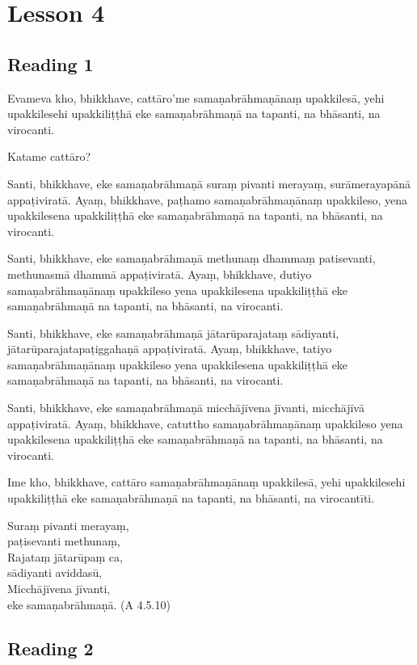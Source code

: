 \chapter{Lesson 4}

\section*{Reading 1}

Evameva kho, bhikkhave, cattāro’me samaṇabrāhmaṇānaṃ upakkilesā, yehi upakkilesehi upakkiliṭṭhā eke samaṇabrāhmaṇā na tapanti, na bhāsanti, na virocanti.

Katame cattāro?

Santi, bhikkhave, eke samaṇabrāhmaṇā suraṃ pivanti merayaṃ, surāmerayapānā appaṭiviratā. Ayaṃ, bhikkhave, paṭhamo samaṇabrāhmaṇānaṃ upakkileso, yena upakkilesena upakkiliṭṭhā eke samaṇabrāhmaṇā na tapanti, na bhāsanti, na virocanti.

Santi, bhikkhave, eke samaṇabrāhmaṇā methunaṃ dhammaṃ patisevanti, methunasmā dhammā appaṭiviratā. Ayaṃ, bhikkhave, dutiyo samaṇabrāhmaṇānaṃ upakkileso yena upakkilesena upakkiliṭṭhā eke samaṇabrāhmaṇā na tapanti, na bhāsanti, na virocanti.

Santi, bhikkhave, eke samaṇabrāhmaṇā jātarūparajataṃ sādiyanti, jātarūparajatapaṭiggahaṇā appaṭiviratā. Ayaṃ, bhikkhave, tatiyo samaṇabrāhmaṇānaṃ upakkileso yena upakkilesena upakkiliṭṭhā eke samaṇabrāhmaṇā na tapanti, na bhāsanti, na virocanti.

Santi, bhikkhave, eke samaṇabrāhmaṇā micchājīvena jīvanti, micchājīvā appaṭiviratā. Ayaṃ, bhikkhave, catuttho samaṇabrāhmaṇānaṃ upakkileso yena upakkilesena upakkiliṭṭhā eke samaṇabrāhmaṇā na tapanti, na bhāsanti, na virocanti.

Ime kho, bhikkhave, cattāro samaṇabrāhmaṇānaṃ upakkilesā, yehi upakkilesehi upakkiliṭṭhā eke samaṇabrāhmaṇā na tapanti, na bhāsanti, na virocantīti.

Suraṃ pivanti merayaṃ,\\
paṭisevanti methunaṃ,\\
Rajataṃ jātarūpaṃ ca,\\
sādiyanti aviddasū,\\
Micchājīvena jīvanti,\\
eke samaṇabrāhmaṇā. \hfill(A 4.5.10)

\section*{Reading 2}

